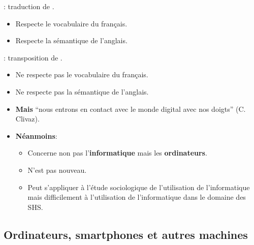 \begin{slide}
		 : traduction de .
		\begin{itemize}
			\item Respecte le vocabulaire du français.
			\item Respecte la sémantique de l'anglais.
		\end{itemize}
\end{slide}	
	
\begin{slide}
 : transposition de .
			\begin{itemize}
				\item Ne respecte pas le vocabulaire du français.
				\item Ne respecte pas la sémantique de l'anglais.
				\item \textbf{Mais} \enquote{nous entrons en contact avec le monde digital avec nos doigts} (C. Clivaz). %

				\item \textbf{Néanmoins}: %
				\begin{itemize}
					\item Concerne non pas l'\textbf{informatique} mais les \textbf{ordinateurs}.
					\item N'est pas nouveau.
					\item Peut s'appliquer à l'étude sociologique de l'utilisation de l'informatique mais difficilement à l'utilisation de l'informatique dans le domaine des SHS.
				\end{itemize}
			\end{itemize}
\end{slide}
\subsection{Ordinateurs, smartphones et autres machines}


